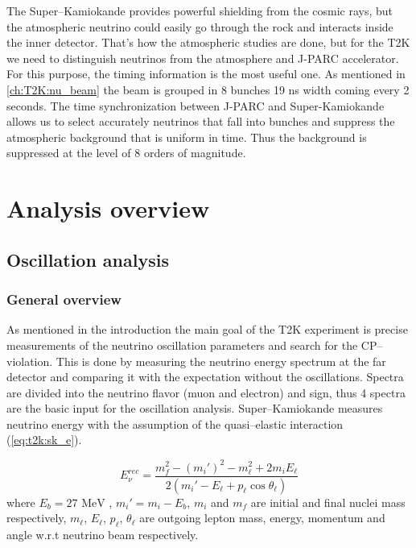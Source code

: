 \documentclass[../main.tex]{subfiles}
\begin{document}
The Super--Kamiokande provides powerful shielding from the cosmic rays, but the atmospheric neutrino could easily go through the rock and interacts inside the inner detector. That's how the atmospheric studies are done, but for the T2K we need to distinguish neutrinos from the atmosphere and J-PARC accelerator. For this purpose, the timing information is the most useful one. As mentioned in \autoref{ch:T2K:nu_beam} the beam is grouped in 8 bunches 19 ns width coming every 2 seconds. The time synchronization between J-PARC and Super-Kamiokande allows us to select accurately neutrinos that fall into bunches and suppress the atmospheric background that is uniform in time. Thus the background is suppressed at the level of 8 orders of magnitude.


\section{Analysis overview}
\subsection{Oscillation analysis}
\subsubsection{General overview}
As mentioned in the introduction the main goal of the T2K experiment is precise measurements of the neutrino oscillation parameters and search for the CP--violation. This is done by measuring the neutrino energy spectrum at the far detector and comparing it with the expectation without the oscillations. Spectra are divided into the neutrino flavor (muon and electron) and sign, thus 4 spectra are the basic input for the oscillation analysis. Super--Kamiokande measures neutrino energy with the assumption of the quasi--elastic interaction (\autoref{eq:t2k:sk_e}).

\begin{equation}
\label{eq:t2k:sk_e}
E_\nu^{rec}=\frac{m_f^2-(m_i')^2-m_\ell^2+2m_iE_\ell}{2\left(m_i'-E_\ell+p_\ell\cos\theta_\ell\right)}
\end{equation}
where $E_b = 27\text{ MeV}$ , $m_i'=m_i-E_b$, $m_i$ and $m_f$ are initial and final nuclei mass respectively, $m_\ell$, $E_\ell$, $p_\ell$, $\theta_\ell$ are outgoing lepton mass, energy, momentum and angle w.r.t neutrino beam respectively.
\end{document}
